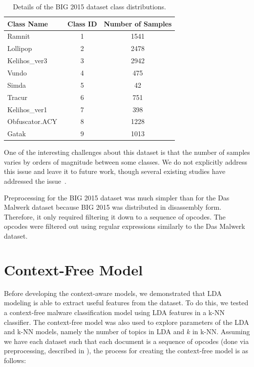 \documentclass[../stegner_thesis.tex]{subfiles}
\begin{document}
\begin{table}[htb]
	\centering
	\caption[BIG 2015 dataset details]{%
		Details of the BIG 2015 dataset class distributions.
	}%
	\label{tab:big_2015_details}
	\begin{tabular}{l c c}
		\toprule
		Class Name & Class ID & Number of Samples \\
		\midrule
		\midrule
		Ramnit~\cite{Win32Ramnit} & 1 & 1541 \\
		Lollipop~\cite{AdwareWin32} & 2 & 2478 \\
		Kelihos\_ver3~\cite{Win32Kelihos} & 3 & 2942 \\
		Vundo~\cite{Win32Vundo} & 4 & 475 \\
		Simda~\cite{Win32Simda} & 5 & 42 \\
		Tracur~\cite{Win32Tracur} & 6 & 751 \\
		Kelihos\_ver1~\cite{Win32Kelihos} & 7 & 398 \\
		Obfuscator.ACY~\cite{VirToolWin32} & 8 & 1228 \\
		Gatak~\cite{Win32Gatak} & 9 & 1013 \\
		\bottomrule
	\end{tabular}
\end{table}

\par One of the interesting challenges about this dataset is that the number of
samples varies by orders of magnitude between some classes.
We do not explicitly address this issue and leave it to future work, though
several existing studies have addressed the issue~\cite{%
	messay-kebedeCombinationTraditional2018,
	zhangUsingMultifeatures2016,
	yueImbalancedMalware2017,
}.

\par Preprocessing for the BIG 2015 dataset was much simpler than for the Das
Malwerk dataset because BIG 2015 was distributed in disassembly form.
Therefore, it only required filtering it down to a sequence of opcodes.
The opcodes were filtered out using regular expressions similarly to the Das
Malwerk dataset.

\section{Context-Free Model}%
\label{sec:mthd_context_free}

\par Before developing the context-aware models, we demonstrated that LDA
modeling is able to extract useful features from the dataset.
To do this, we tested a context-free malware classification model using LDA
features in a k-NN classifier.
The context-free model was also used to explore parameters of the LDA and k-NN
models, namely the number of topics in LDA and $k$ in k-NN\@.
Assuming we have each dataset such that each document is a sequence of opcodes
(done via preprocessing, described in ), the process
for creating the context-free model is as follows:
\end{document}
